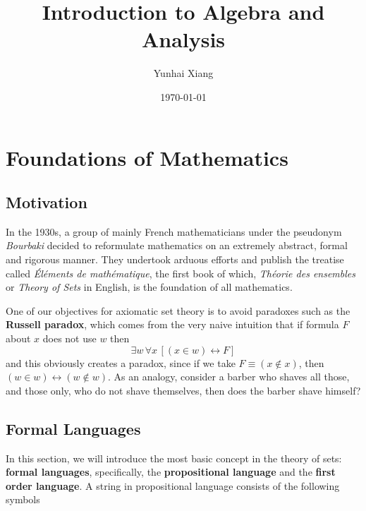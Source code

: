 \documentclass[11pt]{book}
\begin{document}
\title{\Huge \textbf{Introduction to Algebra and Analysis}}
\author{Yunhai Xiang}
\date{\today}
\setcounter{tocdepth}{1}
\maketitle
\doublespacing
\tableofcontents
\singlespacing
\chapter{Foundations of Mathematics}
\section{Motivation}
In the 1930s, a group of mainly French mathematicians under the pseudonym \textsl{Bourbaki} decided to reformulate mathematics on an extremely abstract, formal and rigorous manner. They undertook arduous efforts and  publish the treatise called \textsl{\'El\'ements de math\'ematique}, the first book of which, \textsl{Th\'eorie des ensembles} or \textsl{Theory of Sets} in English, is the foundation of all mathematics.

One of our objectives for axiomatic set theory is to avoid paradoxes such as the \textbf{Russell paradox}, which comes from the very naive intuition that if formula $F$ about $x$ does not use $w$ then
\[\exists w\,\forall x\,[(x\in w)\leftrightarrow F]\]
and this obviously creates a paradox, since if we take $F\equiv (x\not\in x)$, then $(w\in w)\leftrightarrow (w\not\in w)$. As an analogy, consider a barber who shaves all those, and those only, who do not shave themselves, then does the barber shave himself? 

\newpage 
\section{Formal Languages}
In this section, we will introduce the most basic concept in the theory of sets: \textbf{formal languages}, specifically, the \textbf{propositional language} and the \textbf{first order language}.
A string in propositional language consists of the following symbols
\end{document}
